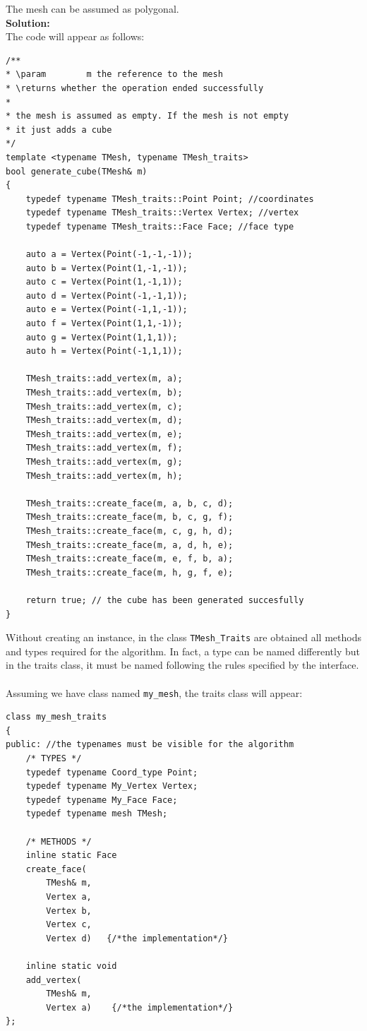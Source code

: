 The mesh can be assumed as polygonal.\\

\textbf{Solution:}\\
The code will appear as follows:


\begin{lstlisting}
/**
* \param		m the reference to the mesh
* \returns whether the operation ended successfully
*
* the mesh is assumed as empty. If the mesh is not empty
* it just adds a cube
*/
template <typename TMesh, typename TMesh_traits>
bool generate_cube(TMesh& m)
{
	typedef typename TMesh_traits::Point Point; //coordinates
	typedef typename TMesh_traits::Vertex Vertex; //vertex
	typedef typename TMesh_traits::Face Face; //face type
	
	auto a = Vertex(Point(-1,-1,-1));
	auto b = Vertex(Point(1,-1,-1));
	auto c = Vertex(Point(1,-1,1));
	auto d = Vertex(Point(-1,-1,1));
	auto e = Vertex(Point(-1,1,-1));
	auto f = Vertex(Point(1,1,-1));
	auto g = Vertex(Point(1,1,1));
	auto h = Vertex(Point(-1,1,1));
	
	TMesh_traits::add_vertex(m, a);
	TMesh_traits::add_vertex(m, b);
	TMesh_traits::add_vertex(m, c);
	TMesh_traits::add_vertex(m, d);
	TMesh_traits::add_vertex(m, e);
	TMesh_traits::add_vertex(m, f);
	TMesh_traits::add_vertex(m, g);
	TMesh_traits::add_vertex(m, h);

	TMesh_traits::create_face(m, a, b, c, d);
	TMesh_traits::create_face(m, b, c, g, f);
	TMesh_traits::create_face(m, c, g, h, d);
	TMesh_traits::create_face(m, a, d, h, e);		
	TMesh_traits::create_face(m, e, f, b, a);		
	TMesh_traits::create_face(m, h, g, f, e);
	
	return true; // the cube has been generated succesfully
}
\end{lstlisting}
\label{code:traits}
Without creating an instance, in the class \texttt{TMesh\_Traits} are obtained all
methods and types required for the algorithm. In fact, a type can be named
differently but in the traits class, it must be named following the rules specified
by the interface.\\
\\
Assuming we have class named \texttt{my\_mesh}, the traits class will appear:
\begin{lstlisting}
class my_mesh_traits
{
public:	//the typenames must be visible for the algorithm
	/* TYPES */
	typedef typename Coord_type Point;
	typedef typename My_Vertex Vertex;
	typedef typename My_Face Face;
	typedef typename mesh TMesh;

	/* METHODS */
	inline static Face
	create_face(
		TMesh& m,
		Vertex a,
		Vertex b,
		Vertex c,
		Vertex d)	{/*the implementation*/}
	
	inline static void
	add_vertex(
		TMesh& m,
		Vertex a)	 {/*the implementation*/}
};
\end{lstlisting}